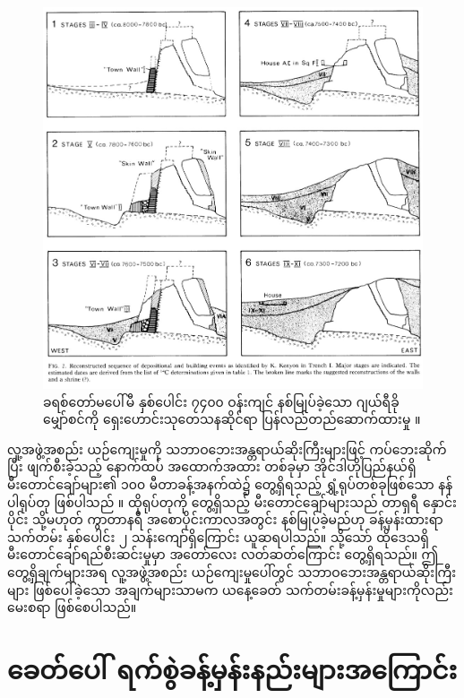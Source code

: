 \documentclass[10pt,twocolumn,letterpaper]{article}
\begin{document}
\begin{figure}[t]
\begin{center}
   \includegraphics[width=1\linewidth]{jericho.jpg}
\end{center}
   \caption{ခရစ်တော်မပေါ်မီ နှစ်ပေါင်း ၇၄၀၀ ဝန်းကျင် နစ်မြုပ်ခဲ့သော ဂျယ်ရီခို မျှော်စင်ကို ရှေးဟောင်းသုတေသနဆိုင်ရာ ပြန်လည်တည်ဆောက်ထားမှု \cite{95}။}
\label{fig:14}
\label{fig:onecol}
\end{figure}

လူ့အဖွဲ့အစည်း ယဉ်ကျေးမှုကို သဘာဝဘေးအန္တရာယ်ဆိုးကြီးများဖြင့် ကပ်ဘေးဆိုက်ပြီး ဖျက်စီးခဲ့သည့် နောက်ထပ် အ‌ထောက်အထား တစ်ခုမှာ အိုင်ဒါဟိုပြည်နယ်ရှိ မီးတောင်ချော်များ၏ ၁၀၀ မီတာခန့်အနက်ထဲ၌ တွေ့ရှိရသည့် ရွှံ့ရုပ်တစ်ခုဖြစ်သော နန်ပါရုပ်တု ဖြစ်ပါသည် \cite{102,103}။ ထိုရုပ်တုကို တွေ့ရှိသည့် မီးတောင်ချော်များသည် တာရှရီ နှောင်းပိုင်း သို့မဟုတ် ကွာတာနရီ အစောပိုင်းကာလအတွင်း နစ်မြုပ်ခဲ့မည်ဟု ခန့်မှန်းထားရာ သက်တမ်း နှစ်ပေါင်း ၂ သန်းကျော်ရှိကြောင်း ယူဆရပါသည်။ သို့သော် ထိုဒေသရှိ မီးတောင်ချော်ရည်စီးဆင်းမှုမှာ အတော်လေး လတ်ဆတ်ကြောင်း တွေ့ရှိရသည်။ ဤတွေ့ရှိချက်များအရ လူ့အဖွဲ့အစည်း ယဉ်ကျေးမှုပေါ်တွင် သဘာဝဘေးအန္တရာယ်ဆိုးကြီးများ ဖြစ်ပေါ်ခဲ့သော အချက်များသာမက ယနေ့ခေတ် သက်တမ်းခန့်မှန်းမှုများကိုလည်း မေးစရာ ဖြစ်စေပါသည်။

\section{ခေတ်ပေါ် ရက်စွဲခန့်မှန်းနည်းများအကြောင်း}
\end{document}
